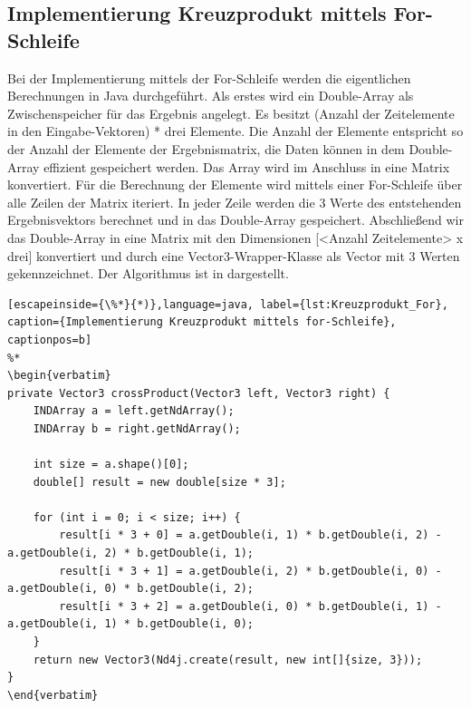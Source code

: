 \subsection{Implementierung Kreuzprodukt mittels For-Schleife}
Bei der Implementierung mittels der For-Schleife werden die eigentlichen Berechnungen in Java durchgeführt.
Als erstes wird ein Double-Array als Zwischenspeicher für das Ergebnis angelegt.
Es besitzt (Anzahl der Zeitelemente in den Eingabe-Vektoren) * drei Elemente.
Die Anzahl der Elemente entspricht so der Anzahl der Elemente der Ergebnismatrix, die Daten können in dem Double-Array effizient gespeichert werden.
Das Array wird im Anschluss in eine Matrix konvertiert.
Für die Berechnung der Elemente wird mittels einer For-Schleife über alle Zeilen der Matrix iteriert.
In jeder Zeile werden die 3 Werte des entstehenden Ergebnisvektors berechnet und in das Double-Array gespeichert.
Abschließend wir das Double-Array in eine Matrix mit den Dimensionen [<Anzahl Zeitelemente> x drei] konvertiert und durch eine Vector3-Wrapper-Klasse als Vector mit 3 Werten gekennzeichnet.
Der Algorithmus ist in  dargestellt.

\begin{lstlisting}[escapeinside={\%*}{*)},language=java, label={lst:Kreuzprodukt_For}, caption={Implementierung Kreuzprodukt mittels for-Schleife}, captionpos=b]
%*
\begin{verbatim}
private Vector3 crossProduct(Vector3 left, Vector3 right) {
    INDArray a = left.getNdArray();
    INDArray b = right.getNdArray();

    int size = a.shape()[0];
    double[] result = new double[size * 3];

    for (int i = 0; i < size; i++) {
        result[i * 3 + 0] = a.getDouble(i, 1) * b.getDouble(i, 2) - a.getDouble(i, 2) * b.getDouble(i, 1);
        result[i * 3 + 1] = a.getDouble(i, 2) * b.getDouble(i, 0) - a.getDouble(i, 0) * b.getDouble(i, 2);
        result[i * 3 + 2] = a.getDouble(i, 0) * b.getDouble(i, 1) - a.getDouble(i, 1) * b.getDouble(i, 0);
    }
    return new Vector3(Nd4j.create(result, new int[]{size, 3}));
}
\end{verbatim}
\end{lstlisting}

